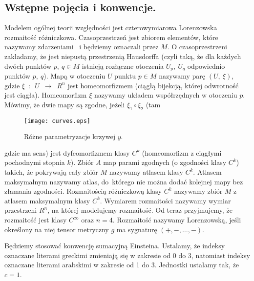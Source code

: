 \subsection{Wstępne pojęcia i konwencje.}
Modelem ogólnej teorii względności jest czterowymiarowa Lorenzowska 
rozmaitość różniczkowa. 
Czasoprzestrzeń jest zbiorem elementów, które nazywamy 
zdarzeniami~\cite{trau1984} i będziemy oznaczali przez $M$.
O czasoprzestrzeni zakładamy, że jest
 niepustą przestrzenią Hausdorffa (czyli taką, że
dla każdych dwóch punktów $p,\ q\in M$ 
istnieją rozłączne otoczenia $U_p,\ U_q$ odpowiednio punktów $p,\ q$). 
Mapą w otoczeniu $U$ punktu $p\in M$ nazywamy parę $(U,\ \xi )$, gdzie  
$\xi$~$:$~$U$~$\to$~$R^n$ jest homeomorfizmem (ciągłą bijekcją, której 
odwrotność jest ciągła). 
Homeomorfizm $\xi$ nazywamy układem współrzędnych 
w otoczeniu $p$.
Mówimy, że dwie mapy są zgodne, jeżeli $\xi_1 \circ \xi_2$ (tam 
\begin{wrapfigure}[29]{r}{4cm}
\centering
\texttt{[image: curves.eps]}
\caption{Różne parametryzacje krzywej $y$.}
\end{wrapfigure}
gdzie ma sens)
jest dyfeomorfizmem klasy $C^k$ (homeomorfizm z 
ciągłymi pochodnymi stopnia $k$). 
Zbiór $A$ map
 parami zgodnych (o zgodności klasy $C^k$) 
takich, że pokrywają cały zbiór $M$ nazywamy 
atlasem klasy $C^k$. Atlasem maksymalnym nazywamy atlas, do~którego
nie można dodać kolejnej mapy bez złamania zgodności.
Rozmaitością różniczkową klasy $C^k$ nazywamy 
zbiór $M$ z atlasem maksymalnym klasy $C^k$.
Wymiarem rozmaitości nazywamy wymiar przestrzeni $R^n$, na której 
modelujemy rozmaitość. Od teraz przyjmujemy, że rozmaitość 
jest klasy $C^\infty$ oraz $n=4$.
Rozmaitość nazywamy Lorenzowską, jeśli określony na niej tensor
metryczny $g$ ma sygnaturę $(+,-,\dots ,-)$.

Będziemy stosować konwencję sumacyjną Einsteina. Ustalamy, że 
indeksy oznaczane literami greckimi zmieniają się w zakresie od 0 do 3, 
natomiast indeksy oznaczane literami arabskimi 
w zakresie od 1 do 3. Jednostki ustalamy tak, że $c=1$.
